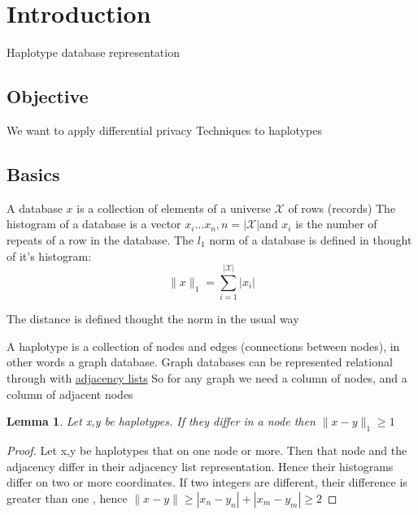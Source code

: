 \documentclass[12pt]{article}
\newtheorem{lemma}{Lemma}
\theoremstyle{definition}
\begin{document}
\maketitle



\section*{Introduction}
Haplotype database representation

\subsection*{Objective}
We want to apply differential privacy Techniques to haplotypes

\subsection*{Basics}
A database $x$ is a collection  of elements of a universe $\mathcal{X}$ of rows (records)
The histogram of a database is a vector $x_i \ldots x_n, n = |\mathcal{X}| $and $x_i$ is the number
of repeats of a row in the database. The $l_1$ norm of a database is defined in thought of
it's histogram:
\begin{equation}
        \|x\|_1 = \sum_{i=1}^{|\mathcal{X}|} |x_i|
\end{equation}



The distance is defined thought the norm in the usual way

A haplotype is a  collection of nodes and edges (connections between nodes), in
other words a graph database.
Graph databases can be represented relational through with \href{https://en.wikipedia.org/wiki/Adjacency_list}{adjacency lists}
So for any graph we need a column of nodes, and a column of adjacent nodes

\begin{lemma}
Let x,y be haplotypes. If they differ in a node then  $\|x-y\|_1 \geq 1$ %
\end{lemma}


\begin{proof}
Let x,y  be haplotypes that on one node or more. Then that node and the adjacency differ in their adjacency list representation. Hence their
histograms differ on two or more coordinates. If two integers are different, their difference is greater than one , hence $\|x-y\| \geq |x_n-y_n| + |x_m-y_m| \geq 2$
\end{proof}
\end{document}
